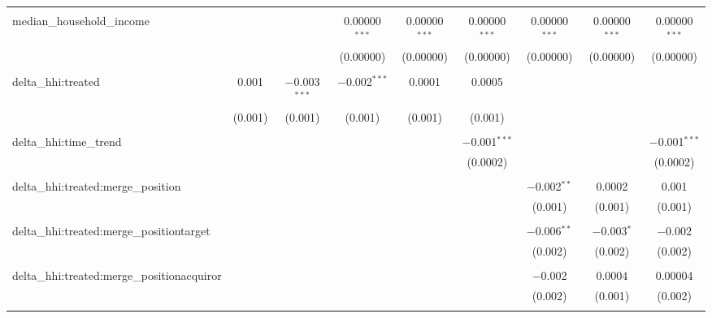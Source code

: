 \begin{table}[H]
{\begin{tabular}{@{\extracolsep{5pt}}lcccccccc}
   & & & & & & & & \\  

  median\_household\_income &  &  & 0.00000$^{***}$ & 0.00000$^{***}$ & 0.00000$^{***}$ & 0.00000$^{***}$ & 0.00000$^{***}$ & 0.00000$^{***}$ \\  

   &  &  & (0.00000) & (0.00000) & (0.00000) & (0.00000) & (0.00000) & (0.00000) \\  

   & & & & & & & & \\  

  delta\_hhi:treated & 0.001 & $-$0.003$^{***}$ & $-$0.002$^{***}$ & 0.0001 & 0.0005 &  &  &  \\  

   & (0.001) & (0.001) & (0.001) & (0.001) & (0.001) &  &  &  \\  

   & & & & & & & & \\  

  delta\_hhi:time\_trend &  &  &  &  & $-$0.001$^{***}$ &  &  & $-$0.001$^{***}$ \\  

   &  &  &  &  & (0.0002) &  &  & (0.0002) \\  

   & & & & & & & & \\  

  delta\_hhi:treated:merge\_position &  &  &  &  &  & $-$0.002$^{**}$ & 0.0002 & 0.001 \\  

   &  &  &  &  &  & (0.001) & (0.001) & (0.001) \\  

   & & & & & & & & \\  

  delta\_hhi:treated:merge\_positiontarget &  &  &  &  &  & $-$0.006$^{**}$ & $-$0.003$^{*}$ & $-$0.002 \\  

   &  &  &  &  &  & (0.002) & (0.002) & (0.002) \\  

   & & & & & & & & \\  

  delta\_hhi:treated:merge\_positionacquiror &  &  &  &  &  & $-$0.002 & 0.0004 & 0.00004 \\  

   &  &  &  &  &  & (0.002) & (0.001) & (0.002) \\  

   & & & & & & & & \\  


\end{tabular}}
\end{table}
